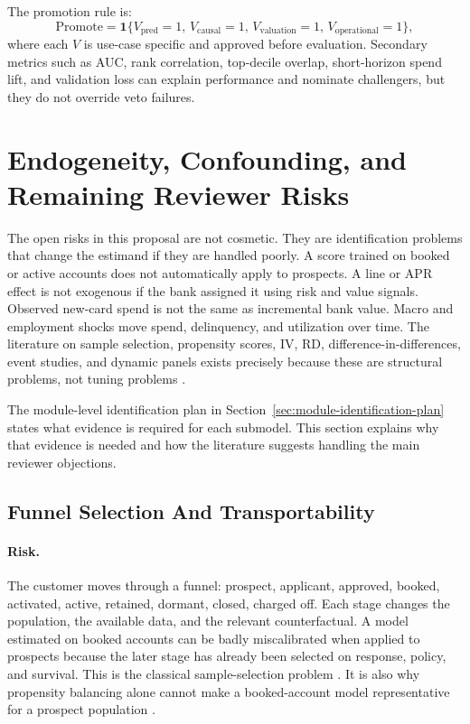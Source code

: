 \documentclass[11pt]{article}
\newcommand{\1}{\mathbf{1}}
\begin{document}
The promotion rule is:
\[
  \mathrm{Promote}
  =
  \1\{
    V_{\mathrm{pred}}=1,\,
    V_{\mathrm{causal}}=1,\,
    V_{\mathrm{valuation}}=1,\,
    V_{\mathrm{operational}}=1
  \},
\]
where each $V$ is use-case specific and approved before evaluation. Secondary
metrics such as AUC, rank correlation, top-decile overlap, short-horizon spend
lift, and validation loss can explain performance and nominate challengers,
but they do not override veto failures.

\section{Endogeneity, Confounding, and Remaining Reviewer Risks}
\label{sec:reviewer-risks}

The open risks in this proposal are not cosmetic. They are identification
problems that change the estimand if they are handled poorly. A score trained
on booked or active accounts does not automatically apply to prospects. A line
or APR effect is not exogenous if the bank assigned it using risk and value
signals. Observed new-card spend is not the same as incremental bank value.
Macro and employment shocks move spend, delinquency, and utilization over
time. The literature on sample selection, propensity scores, IV, RD,
difference-in-differences, event studies, and dynamic panels exists precisely
because these are structural problems, not tuning problems
\citep{heckman1979selection,rosenbaum1983propensity,angristimbensrubin1996iv,
lee2010rd,callaway2021did,sun2021eventstudy,arellano1991panel,
blundell1998initial,hernanrobins2020causal}.

The module-level identification plan in
Section~\ref{sec:module-identification-plan} states what evidence is required
for each submodel. This section explains why that evidence is needed and how
the literature suggests handling the main reviewer objections.

\subsection{Funnel Selection And Transportability}

\paragraph{Risk.}
The customer moves through a funnel: prospect, applicant, approved, booked,
activated, active, retained, dormant, closed, charged off. Each stage changes
the population, the available data, and the relevant counterfactual. A model
estimated on booked accounts can be badly miscalibrated when applied to
prospects because the later stage has already been selected on response,
policy, and survival. This is the classical sample-selection problem
\citep{heckman1979selection}. It is also why propensity balancing alone cannot
make a booked-account model representative for a prospect population
\citep{rosenbaum1983propensity,imbenswooldridge2009recent}.
\end{document}
